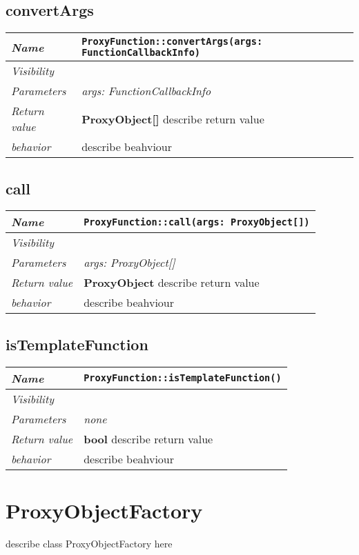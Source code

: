  \section{convertArgs}
\begin{longtable}{p{3cm} @{\hskip 1cm} p{12cm}}
 \hline
\textit{Name} & \texttt{ProxyFunction::convertArgs(args: FunctionCallbackInfo)}\\
\hline
 \textit{Visibility} & \\
\hline
\textit{Parameters} & \textit{args: FunctionCallbackInfo}\\
\hline
\textit{Return value} & \textbf{ ProxyObject[]} describe return value\\
  \hline
 \textit{behavior} & describe beahviour \\
\hline
\end{longtable} \pagebreak
 \section{call}
\begin{longtable}{p{3cm} @{\hskip 1cm} p{12cm}}
 \hline
\textit{Name} & \texttt{ProxyFunction::call(args: ProxyObject[])}\\
\hline
 \textit{Visibility} & \\
\hline
\textit{Parameters} & \textit{args: ProxyObject[]}\\
\hline
\textit{Return value} & \textbf{ ProxyObject} describe return value\\
  \hline
 \textit{behavior} & describe beahviour \\
\hline
\end{longtable} \pagebreak
 \section{isTemplateFunction}
\begin{longtable}{p{3cm} @{\hskip 1cm} p{12cm}}
 \hline
\textit{Name} & \texttt{ProxyFunction::isTemplateFunction()}\\
\hline
 \textit{Visibility} & \\
\hline
\textit{Parameters} & \textit{none}\\
\hline
\textit{Return value} & \textbf{ bool} describe return value\\
  \hline
 \textit{behavior} & describe beahviour \\
\hline
\end{longtable} \pagebreak
 \chapter{ProxyObjectFactory}
describe class ProxyObjectFactory here
